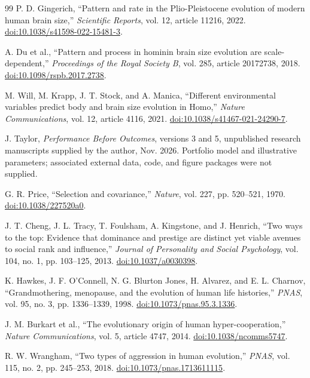 \documentclass[10pt,twocolumn,letterpaper]{article}
\begin{document}
\begin{thebibliography}{99}
 P. D. Gingerich, ``Pattern and rate in the Plio-Pleistocene evolution of modern human brain size,'' \emph{Scientific Reports}, vol. 12, article 11216, 2022. \href{https://doi.org/10.1038/s41598-022-15481-3}{doi:10.1038/s41598-022-15481-3}.

 A. Du et al., ``Pattern and process in hominin brain size evolution are scale-dependent,'' \emph{Proceedings of the Royal Society B}, vol. 285, article 20172738, 2018. \href{https://doi.org/10.1098/rspb.2017.2738}{doi:10.1098/rspb.2017.2738}.

 M. Will, M. Krapp, J. T. Stock, and A. Manica, ``Different environmental variables predict body and brain size evolution in Homo,'' \emph{Nature Communications}, vol. 12, article 4116, 2021. \href{https://doi.org/10.1038/s41467-021-24290-7}{doi:10.1038/s41467-021-24290-7}.

 J. Taylor, \emph{Performance Before Outcomes}, versions 3 and 5, unpublished research manuscripts supplied by the author, Nov. 2026. Portfolio model and illustrative parameters; associated external data, code, and figure packages were not supplied.

 G. R. Price, ``Selection and covariance,'' \emph{Nature}, vol. 227, pp. 520--521, 1970. \href{https://doi.org/10.1038/227520a0}{doi:10.1038/227520a0}.

 J. T. Cheng, J. L. Tracy, T. Foulsham, A. Kingstone, and J. Henrich, ``Two ways to the top: Evidence that dominance and prestige are distinct yet viable avenues to social rank and influence,'' \emph{Journal of Personality and Social Psychology}, vol. 104, no. 1, pp. 103--125, 2013. \href{https://doi.org/10.1037/a0030398}{doi:10.1037/a0030398}.

 K. Hawkes, J. F. O'Connell, N. G. Blurton Jones, H. Alvarez, and E. L. Charnov, ``Grandmothering, menopause, and the evolution of human life histories,'' \emph{PNAS}, vol. 95, no. 3, pp. 1336--1339, 1998. \href{https://doi.org/10.1073/pnas.95.3.1336}{doi:10.1073/pnas.95.3.1336}.

 J. M. Burkart et al., ``The evolutionary origin of human hyper-cooperation,'' \emph{Nature Communications}, vol. 5, article 4747, 2014. \href{https://doi.org/10.1038/ncomms5747}{doi:10.1038/ncomms5747}.

 R. W. Wrangham, ``Two types of aggression in human evolution,'' \emph{PNAS}, vol. 115, no. 2, pp. 245--253, 2018. \href{https://doi.org/10.1073/pnas.1713611115}{doi:10.1073/pnas.1713611115}.


\end{thebibliography}
\end{document}
